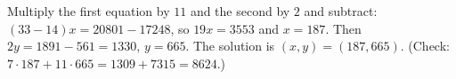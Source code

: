 Multiply the first equation by $11$ and the second by $2$ and subtract: $(33-14)x=20801-17248$, so $19x=3553$ and $x=187$. Then $2y=1891-561=1330$, $y=665$. The solution is $\boxed{(x,y)=(187,665)}$. (Check: $7\cdot187+11\cdot665=1309+7315=8624$.)
